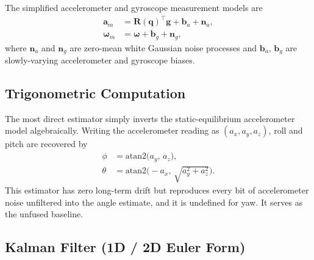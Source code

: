 \documentclass[conference]{IEEEtran}
\newcommand{\bm}[1]{\mathbf{#1}}
\begin{document}
The simplified accelerometer and gyroscope measurement models are
\begin{align}
\bm{a}_m &= \bm{R}(\bm{q})^\top \bm{g} + \bm{b}_a + \bm{n}_a, \\
\boldsymbol{\omega}_m &= \boldsymbol{\omega} + \bm{b}_g + \bm{n}_g,
\end{align}
where $\bm{n}_a$ and $\bm{n}_g$ are zero-mean white Gaussian noise
processes and $\bm{b}_a$, $\bm{b}_g$ are slowly-varying
accelerometer and gyroscope biases.

\subsection{Trigonometric Computation}

The most direct estimator simply inverts the static-equilibrium
accelerometer model algebraically. Writing the accelerometer
reading as $(a_x,a_y,a_z)$, roll and pitch are recovered by
\begin{align}
\phi &= \mathrm{atan2}\bigl(a_y,\, a_z\bigr), \\
\theta &= \mathrm{atan2}\bigl(-a_x,\, \sqrt{a_y^2 + a_z^2}\bigr).
\end{align}
This estimator has zero long-term drift but reproduces every bit
of accelerometer noise unfiltered into the angle estimate, and it
is undefined for yaw. It serves as the unfused baseline.

\subsection{Kalman Filter (1D / 2D Euler Form)}
\end{document}
